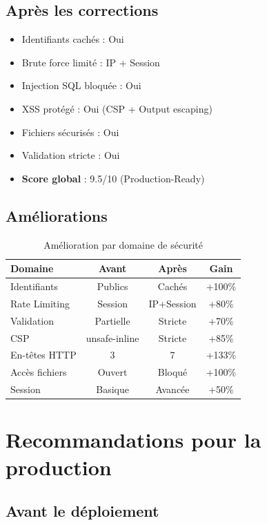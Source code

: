 \documentclass[11pt,a4paper,french]{report}
\begin{document}
\subsection{Après les corrections}

\begin{itemize}
    \item Identifiants cachés : Oui
    \item Brute force limité : IP + Session
    \item Injection SQL bloquée : Oui
    \item XSS protégé : Oui (CSP + Output escaping)
    \item Fichiers sécurisés : Oui
    \item Validation stricte : Oui
    \item \textbf{Score global} : 9.5/10 (Production-Ready)
\end{itemize}

\subsection{Améliorations}

\begin{table}[H]
\centering
\caption{Amélioration par domaine de sécurité}
\begin{tabular}{|l|c|c|c|}
\hline
\textbf{Domaine} & \textbf{Avant} & \textbf{Après} & \textbf{Gain} \\
\hline
Identifiants & Publics & Cachés & +100\% \\
\hline
Rate Limiting & Session & IP+Session & +80\% \\
\hline
Validation & Partielle & Stricte & +70\% \\
\hline
CSP & unsafe-inline & Stricte & +85\% \\
\hline
En-têtes HTTP & 3 & 7 & +133\% \\
\hline
Accès fichiers & Ouvert & Bloqué & +100\% \\
\hline
Session & Basique & Avancée & +50\% \\
\hline
\end{tabular}
\end{table}

\newpage

\section{Recommandations pour la production}

\subsection{Avant le déploiement}
\end{document}

